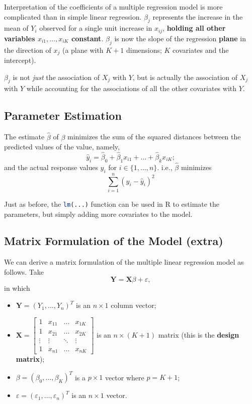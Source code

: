 \documentclass[12pt]{article}
\begin{document}
Interpretation of the coefficients of a multiple regression model is more complicated than in simple linear regression. $\beta_j$ represents the increase in the mean of $Y_i$ observed for a single unit increase in $x_{ij}$, \textbf{holding all other variables $x_{i1}, \dots, x_{iK}$ constant}. $\beta_j$ is now the slope of the regression \textbf{plane} in the direction of $x_j$ (a plane with $K + 1$ dimensions; $K$ covariates and the intercept). 

$\beta_j$ is not \textit{just} the association of $X_j$ with $Y$, but is actually the association of $X_j$ with $Y$ while accounting for the associations of all the other covariates with $Y$.

\subsection{Parameter Estimation}

The estimate $\hat{\beta}$ of $\beta$ minimizes the sum of the squared distances between the predicted values of the value, namely, \[\hat{y}_i = \hat{\beta}_0 + \hat{\beta}_1 x_{i1} + \dots + \hat{\beta}_k x_{iK};\] and the actual response values $y_i$ for $i \in \{1, \dots, n\}$. i.e., $\hat{\beta}$ minimizes \[\sum_{i=1}^n (y_i - \hat{y}_i)^2\]

Just as before, the \lstinline[language=R]{lm(...)} function can be used in R to estimate the parameters, but simply adding more covariates to the model.

\subsection{Matrix Formulation of the Model (extra)}

We can derive a matrix formulation of the multiple linear regression model as follows. Take \[\mathbf{Y} = \mathbf{X}\beta + \varepsilon,\] in which \begin{itemize}
    \item $\mathbf{Y} = (Y_1, \dots, Y_n)^T$ is an $n \times 1$ column vector;
    \item $\mathbf{X} = \begin{bmatrix}
    1 & x_{11} & \dots & x_{1K}\\
    1  & x_{21} & \dots & x_{2K}\\
    \vdots & \vdots & \ddots & \vdots\\
    1 & x_{n1} & \dots & x_{nK}
    \end{bmatrix}$ is an $n \times (K + 1)$ matrix (this is the \textbf{design matrix});
    \item $\beta = (\beta_0,\dots, \beta_K)^T$ is a $p \times 1$ vector where $p = K+1$;
    \item $\varepsilon = (\varepsilon_1, \dots, \varepsilon_n)^T$ is an $n \times 1$ vector.
\end{itemize}
\end{document}
